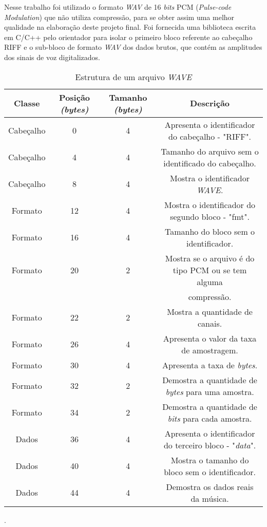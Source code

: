 \documentclass[a4paper,12pt,twoside,openright]{report}
\begin{document}
\par Nesse trabalho foi utilizado o formato \textit{WAV} de 16 \textit{bits} PCM (\textit{Pulse-code Modulation}) que n\~{a}o utiliza compress\~{a}o, para se obter assim uma melhor qualidade na elabora\c{c}\~{a}o deste projeto final. Foi fornecida uma biblioteca escrita em C/C++ pelo orientador para isolar o primeiro bloco referente ao cabe{\c c}alho RIFF e o sub-bloco de formato \textit{WAV} dos dados brutos, que cont\'{e}m as amplitudes dos sinais de voz digitalizados.

\vspace*{+10pt}

\begin{table}[h] 
	\centering
	\caption{Estrutura de um arquivo \textit{WAVE}}
	\begin{tabular}{c|c|c|c}
		\textbf{Classe} & \textbf{Posi\c{c}\~{a}o \textit{(bytes)}} & \textbf{Tamanho \textit{(bytes)}} & \textbf{Descri\c{c}\~{a}o}\\
		\hline
		Cabe\c{c}alho & 0 & 4 & Apresenta o identificador do cabe\c{c}alho - "RIFF".\\
		Cabe\c{c}alho & 4 & 4 & Tamanho do arquivo sem o identificado do cabe\c{c}alho.\\
		Cabe\c{c}alho & 8 & 4 & Mostra o identificador \textit{WAVE}.\\
		\hline
		Formato & 12 & 4 & Mostra o identificador do segundo bloco - "fmt".\\
		Formato & 16 & 4 & Tamanho do bloco sem o identificador.\\
		Formato & 20 & 2 & Mostra se o arquivo \'{e} do tipo PCM ou se tem alguma \\ & & & compress\~{a}o.\\
		Formato & 22 & 2 & Mostra a quantidade de canais.\\
		Formato & 26 & 4 & Apresenta o valor da taxa de amostragem.\\
		Formato & 30 & 4 & Apresenta a taxa de \textit{bytes}.\\
		Formato & 32 & 2 & Demostra a quantidade de \textit{bytes} para uma amostra.\\
		Formato & 34 & 2 & Demostra a quantidade de \textit{bits} para cada amostra.\\
		\hline
		Dados & 36 & 4 & Apresenta o identificador do terceiro bloco - "\textit{data}".\\
		Dados & 40 & 4 & Mostra o tamanho do bloco sem o identificador.\\
		Dados & 44 & 4 & Demostra os dados reais da m\'{u}sica.
		
	\end{tabular}
\end{table}    
. 
\end{document}
